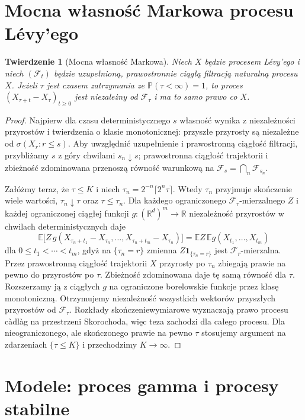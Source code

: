 \documentclass[11pt,a4paper,oneside]{report}
\numberwithin{equation}{chapter}
\theoremstyle{plain}
\newtheorem{twierdzenie}{Twierdzenie}[chapter]
\theoremstyle{definition}
\theoremstyle{remark}
\newcommand{\R}{\mathbb{R}}
\newcommand{\Prob}{\mathbb{P}}
\newcommand{\E}{\mathbb{E}}
\newcommand{\calF}{\mathcal{F}}
\newcommand{\ind}[1]{\mathbf{1}_{#1}}
\begin{document}
\section{Mocna własność Markowa procesu Lévy'ego}

\begin{twierdzenie}[Mocna własność Markowa]
\label{th:levy-strong-markov}
Niech $X$ będzie procesem Lévy'ego i niech
$(\calF_t)$ będzie uzupełnioną, prawostronnie ciągłą
filtracją naturalną procesu $X$.
Jeżeli $\tau$ jest czasem zatrzymania ze
$\Prob(\tau<\infty)=1$, to proces
$(X_{\tau+t}-X_\tau)_{t\ge0}$ jest niezależny od
$\calF_\tau$ i ma to samo prawo co $X$.
\end{twierdzenie}
\begin{proof}
Najpierw dla czasu deterministycznego $s$ własność wynika
z niezależności przyrostów i twierdzenia o klasie
monotonicznej: przyszłe przyrosty są niezależne od
$\sigma(X_r:r\le s)$. Aby uwzględnić uzupełnienie i
prawostronną ciągłość filtracji, przybliżamy $s$ z góry
chwilami $s_n\downarrow s$; prawostronna ciągłość
trajektorii i zbieżność zdominowana przenoszą równość
warunkową na $\calF_s=\bigcap_{n}\calF_{s_n}$.

Załóżmy teraz, że $\tau\le K$ i niech
$\tau_n=2^{-n}\lceil2^n\tau\rceil$.
Wtedy $\tau_n$ przyjmuje skończenie wiele wartości,
$\tau_n\downarrow\tau$ oraz $\tau\le\tau_n$.
Dla każdego ograniczonego $\calF_\tau$-mierzalnego $Z$
i każdej ograniczonej ciągłej funkcji
$g:(\R^d)^m\to\R$ niezależność przyrostów w
chwilach deterministycznych daje
\[
\E\Big[Z\,g(X_{\tau_n+t_1}-X_{\tau_n},\ldots,
 X_{\tau_n+t_m}-X_{\tau_n})\Big]
=\E Z\,\E g(X_{t_1},\ldots,X_{t_m})
\]
dla $0\le t_1<\cdots<t_m$, gdyż na
$\{\tau_n=r\}$ zmienna $Z\ind{\{\tau_n=r\}}$
jest $\calF_r$-mierzalna. Przez prawostronną ciągłość
trajektorii $X$ przyrosty po $\tau_n$ zbiegają
prawie na pewno do przyrostów po $\tau$.
Zbieżność zdominowana daje tę samą równość dla $\tau$.
Rozszerzamy ją z ciągłych $g$ na ograniczone borelowskie
funkcje przez klasę monotoniczną. Otrzymujemy niezależność
wszystkich wektorów przyszłych przyrostów od $\calF_\tau$.
Rozkłady skończeniewymiarowe wyznaczają prawo procesu
càdlàg na przestrzeni Skorochoda, więc teza zachodzi
dla całego procesu. Dla nieograniczonego, ale skończonego
prawie na pewno $\tau$ stosujemy argument na zdarzeniach
$\{\tau\le K\}$ i przechodzimy $K\to\infty$.
\end{proof}

\section{Modele: proces gamma i procesy stabilne}
\end{document}

